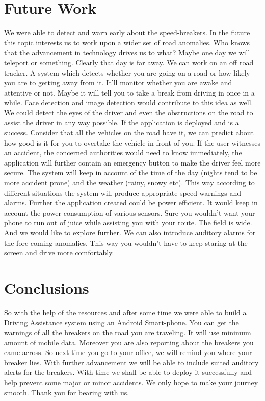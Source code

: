 \documentclass[12pt,twocolumn]{article}
\begin{document}
\section{Future Work}
We were able to detect and warn early about the speed-breakers. In the future this topic interests us to work upon a wider set of road anomalies. Who knows that the advancement in technology drives us to what? Maybe one day we will teleport or something. Clearly that day is far away.
We can work on an off road tracker. A system which detects whether you are going on a road or how likely you are to getting away from it. It'll monitor whether you are awake and attentive or not. Maybe it will tell you to take a break from driving in once in a while.
Face detection and image detection would contribute to this idea as well. We could detect the eyes of the driver and even the obstructions on the road to assist the driver in any way possible.
If the application is deployed and is a success. Consider that all the vehicles on the road have it, we can predict about how good is it for you to overtake the vehicle in front of you.
If the user witnesses an accident, the concerned authorities would need to know immediately, the application will further contain an emergency button to make the driver feel more secure.
The system will keep in account of the time of the day (nights tend to be more accident prone) and the weather (rainy, snowy etc). This way according to different situations the system will produce appropriate speed warnings and alarms.
Further the application created could be power efficient. It would keep in account the power consumption of various sensors. Sure you wouldn't want your phone to run out of juice while assisting you with your route.
The field is wide. And we would like to explore further. We can also introduce auditory alarms for the fore coming anomalies. This way you wouldn't have to keep staring at the screen and drive more comfortably.\\
\section{Conclusions}
So with the help of the resources and after some time we were able to build a Driving Assistance system using an Android Smart-phone. You can get the warnings of all the breakers on the road you are traveling. It will use minimum amount of mobile data. Moreover you are also reporting about the breakers you came across. So next time you go to your office, we will remind you where your breaker lies.
With further advancement we will be able to include suited auditory alerts for the breakers.
With time we shall be able to deploy it successfully and help prevent some major or minor accidents. We only hope to make your journey smooth. Thank you for bearing with us.\\
\end{document}
